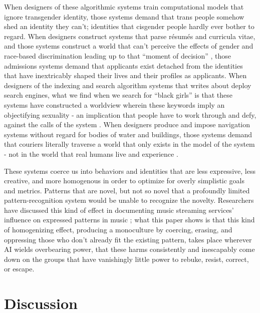 \documentclass[manuscript,screen]{acmart}
\begin{document}
When designers of these algorithmic systems train computational models that ignore transgender identity, those systems demand that trans people somehow shed an identity they can't;
identities that cisgender people hardly ever bother to regard.
When designers construct systems that parse résumés and curricula vitae, and those systems construct a world that can't perceive the effects of gender and race-based discrimination leading up to that ``moment of decision''
\cite{streetLevelAlgorithms}, those admissions systems demand that applicants exist detached from the identities that have inextricably shaped their lives and their profiles as applicants.
When designers of the indexing and search algorithm systems that \citeauthor{noble2018algorithms} writes about deploy search engines, what we find when we search for ``black girls'' is that these systems have constructed a worldview wherein these keywords imply an objectifying sexuality - an implication that people have to work through and defy, against the calls of the system
\cite{noble2018algorithms}.
When designers produce and impose navigation systems without regard for bodies of water and buildings, those systems demand that couriers literally traverse a world that only exists in the model of the system - not in the world that real humans live and experience
\cite{GoJekAlgo}.

These systems coerce us into behaviors and identities that are less expressive, less creative, and more homogenous in order to optimize for overly simplistic goals and metrics.
Patterns that are novel, but not so novel that a profoundly limited pattern-recognition system would be unable to recognize the novelty.
Researchers have discussed this kind of effect in documenting music streaming services' influence on expressed patterns in music
\cite{spotifyLengths};
what this paper shows is that this kind of homogenizing effect, producing a monoculture by coercing, erasing, and oppressing those who don't already fit the existing pattern, takes place wherever AI wields overbearing power, that these harms consistently and inescapably come down on the groups that have vanishingly little power to rebuke, resist, correct, or escape.

\section{Discussion}
\end{document}
